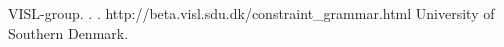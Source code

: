 \documentclass[11pt]{article}
\begin{document}
\begin{thebibliography}{}

{VISL-group}.
.
.
\newblock http://beta.visl.sdu.dk/constraint\_grammar.html
\newblock University of Southern Denmark.


\end{thebibliography}


%
%



	
\end{document}

